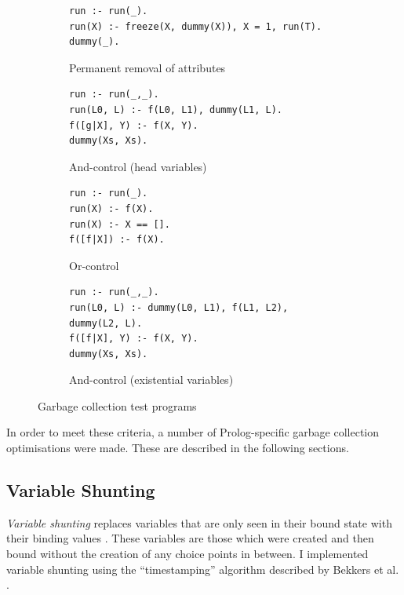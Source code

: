 \begin{figure}[H]
\centering
\begin{subfigure}{\textwidth}
\centering
\begin{verbatim}
run :- run(_).
run(X) :- freeze(X, dummy(X)), X = 1, run(T).
dummy(_).
\end{verbatim}
\caption{Permanent removal of attributes}
\end{subfigure}
\par\bigskip
\par\bigskip
\begin{subfigure}{.65\textwidth}
\centering
\begin{verbatim}
run :- run(_,_).
run(L0, L) :- f(L0, L1), dummy(L1, L).
f([g|X], Y) :- f(X, Y).
dummy(Xs, Xs).
\end{verbatim}
\caption{And-control (head variables)}
\end{subfigure}%
\begin{subfigure}{.35\textwidth}
\centering
\begin{verbatim}
run :- run(_).
run(X) :- f(X).
run(X) :- X == [].
f([f|X]) :- f(X).
\end{verbatim}
\caption{Or-control}
\label{fig:or-control}
\end{subfigure}
\par\bigskip
\par\bigskip
\begin{subfigure}{\textwidth}
\centering
\begin{verbatim}
run :- run(_,_).
run(L0, L) :- dummy(L0, L1), f(L1, L2), dummy(L2, L).
f([f|X], Y) :- f(X, Y).
dummy(Xs, Xs).
\end{verbatim}
\caption{And-control (existential variables)}
\end{subfigure}
\caption{Garbage collection test programs}
\label{fig:gc-programs}
\end{figure}

In order to meet these criteria, a number of Prolog-specific garbage collection optimisations were made. These are described in the following sections.

\subsection{Variable Shunting}

\label{sec:variable-shunting}

\emph{Variable shunting} replaces variables that are only seen in their bound state with their binding values \cite{sahlinVariableShuntingWAM1991}. These variables are those which were created and then bound without the creation of any choice points in between. I implemented variable shunting using the ``timestamping'' algorithm described by Bekkers et al. \cite{bekkersDynamicMemoryManagement1992}.

